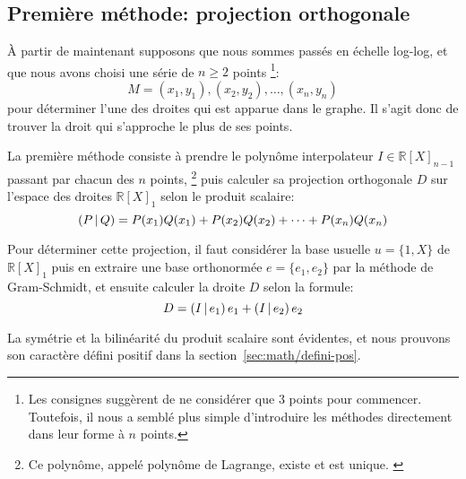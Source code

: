 \subsection{Première méthode: projection orthogonale}

À partir de maintenant supposons que nous sommes passés en échelle log-log,
et que nous avons choisi une série de $n\geq 2$ points%
\footnote{
    Les consignes suggèrent de ne considérer que 3 points pour commencer.
    Toutefois, il nous a semblé plus simple d'introduire les méthodes
    directement dans leur forme à $n$ points.
}:
\[
    M = (x_1,y_1),(x_2,y_2),\ldots,(x_n,y_n)
\]
pour déterminer l'une des droites qui est apparue dans le graphe.
Il s'agit donc de trouver la droit qui s'approche le plus de ses points.

La première méthode consiste à prendre le polynôme interpolateur
$I \in \mathbb{R}[X]_{n-1}$ passant par chacun des $n$ points,%
\footnote{
    Ce polynôme, appelé polynôme de Lagrange, existe et est unique.%
    \cite{lagrange-poly}
}
puis calculer sa projection orthogonale $D$
sur l'espace des droites $\mathbb{R}[X]_1$
selon le produit scalaire:
\begin{equation}
    \left(P\,\middle|\,Q\right) = P(x_1)Q(x_1) + P(x_2)Q(x_2) + \cdots + P(x_n)Q(x_n)
\end{equation}

Pour déterminer cette projection, il faut considérer la base usuelle
$u=\{1,X\}$ de $\mathbb{R}[X]_1$
puis en extraire une base orthonormée $e=\{e_1,e_2\}$ par la méthode
de Gram-Schmidt, et ensuite calculer la droite $D$
selon la formule:
\begin{equation}
    D = \left(I\,\middle|\,e_1\right)e_1 + \left(I\,\middle|\,e_2\right)e_2
\end{equation}

La symétrie et la bilinéarité du produit scalaire sont évidentes,
et nous prouvons son caractère défini positif dans
la section~\ref{sec:math/defini-pos}.
